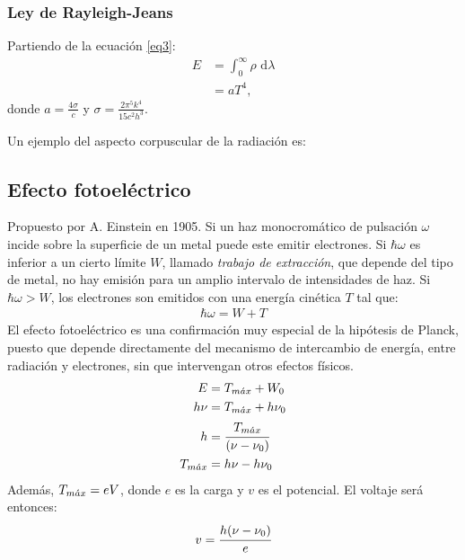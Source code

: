 \documentclass[../main]{subfiles}
\begin{document}
\subsubsection{Ley de Rayleigh-Jeans}
Partiendo de la ecuación \ref{eq3}:
\begin{align}
    E&=\int_0^\infty\rho\text{ d}\lambda\\
    &=aT^4,
\end{align}
donde $\displaystyle a=\frac{4\sigma}{c}$ y $\displaystyle \sigma=\frac{2\pi^5 k^4}{15c^2 h^3}$.

Un ejemplo del aspecto corpuscular de la radiación es:
\subsection{Efecto fotoeléctrico}
Propuesto por A. Einstein en 1905. Si un haz monocromático de pulsación $\omega$ incide sobre la superficie de un metal puede este emitir electrones. Si $\hbar\omega$ es inferior a un cierto límite $W$, llamado \textit{trabajo de extracción}, que depende del tipo de metal, no hay emisión para un amplio intervalo de intensidades de haz. Si $\hbar\omega > W$, los electrones son emitidos con una energía cinética $T$ tal que:
\begin{align}
    \hbar\omega = W + T
\end{align}
El efecto fotoeléctrico es una confirmación muy especial de la hipótesis de Planck, puesto que depende directamente del mecanismo de intercambio de energía, entre radiación y electrones, sin que intervengan otros efectos físicos.
\begin{align}
    E&=T_{m\Acute{a}x}+W_0\\
    h\nu&=T_{m\Acute{a}x}+h\nu_0\\
    h&=\cfrac{T_{m\Acute{a}x}}{\left(\nu-\nu_0\right)}\\
    T_{m\Acute{a}x}&=h\nu-h\nu_0
\end{align}
Además, $T_{m\Acute{a}x}=eV$, donde $e$ es la carga y $v$ es el potencial. El voltaje será entonces:
\begin{align}
    v=\cfrac{h(\nu-\nu_0)}{e}
\end{align}
\end{document}
